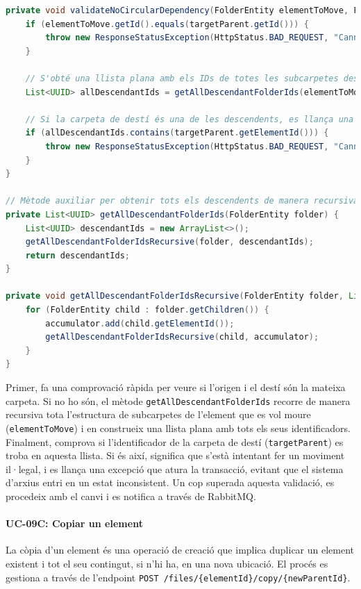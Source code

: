 \begin{lstlisting}[language=Java, caption={Validació de dependències circulars a `FolderService`}]
private void validateNoCircularDependency(FolderEntity elementToMove, FolderEntity targetParent) {
    if (elementToMove.getId().equals(targetParent.getId())) {
        throw new ResponseStatusException(HttpStatus.BAD_REQUEST, "Cannot move a folder to itself");
    }
    
    // S'obté una llista plana amb els IDs de totes les subcarpetes descendents
    List<UUID> allDescendantIds = getAllDescendantFolderIds(elementToMove);

    // Si la carpeta de destí és una de les descendents, es llança una excepció
    if (allDescendantIds.contains(targetParent.getElementId())) {
        throw new ResponseStatusException(HttpStatus.BAD_REQUEST, "Cannot move a folder to one of its own subfolders");
    }
}

// Mètode auxiliar per obtenir tots els descendents de manera recursiva
private List<UUID> getAllDescendantFolderIds(FolderEntity folder) {
    List<UUID> descendantIds = new ArrayList<>();
    getAllDescendantFolderIdsRecursive(folder, descendantIds);
    return descendantIds;
}

private void getAllDescendantFolderIdsRecursive(FolderEntity folder, List<UUID> accumulator) {
    for (FolderEntity child : folder.getChildren()) {
        accumulator.add(child.getElementId());
        getAllDescendantFolderIdsRecursive(child, accumulator);
    }
}
\end{lstlisting}

Primer, fa una comprovació ràpida per veure si l'origen i el destí són la mateixa carpeta. Si no ho són, el mètode \texttt{getAllDescendantFolderIds} recorre de manera recursiva tota l'estructura de subcarpetes de l'element que es vol moure (\texttt{elementToMove}) i en construeix una llista plana amb tots els seus identificadors. Finalment, comprova si l'identificador de la carpeta de destí (\texttt{targetParent}) es troba en aquesta llista. Si és així, significa que s'està intentant fer un moviment il·legal, i es llança una excepció que atura la transacció, evitant que el sistema d'arxius entri en un estat inconsistent. Un cop superada aquesta validació, es procedeix amb el canvi i es notifica a través de RabbitMQ.

\paragraph{UC-09C: Copiar un element} La còpia d'un element és una operació de creació que implica duplicar un element existent i tot el seu contingut, si n'hi ha, en una nova ubicació. El procés es gestiona a través de l'endpoint \texttt{POST /files/\{elementId\}/copy/\{newParentId\}}.

